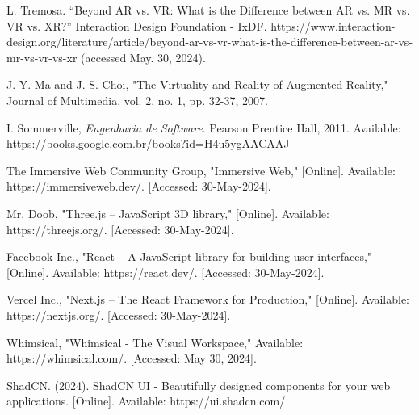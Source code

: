 \documentclass[conference]{IEEEtran}
\begin{document}
\begin{thebibliography}{00}
  L. Tremosa. “Beyond AR vs. VR: What is the Difference between AR vs. MR vs. VR vs. XR?” Interaction Design Foundation - IxDF. https://www.interaction-design.org/literature/article/beyond-ar-vs-vr-what-is-the-difference-between-ar-vs-mr-vs-vr-vs-xr (accessed May. 30, 2024).

  J. Y. Ma and J. S. Choi, "The Virtuality and Reality of Augmented Reality," Journal of Multimedia, vol. 2, no. 1, pp. 32-37, 2007.

  I. Sommerville, \emph{Engenharia de Software}. Pearson Prentice Hall, 2011. Available: https://books.google.com.br/books?id=H4u5ygAACAAJ

  The Immersive Web Community Group, "Immersive Web," [Online]. Available: https://immersiveweb.dev/. [Accessed: 30-May-2024].

  Mr. Doob, "Three.js – JavaScript 3D library," [Online]. Available: https://threejs.org/. [Accessed: 30-May-2024].

  Facebook Inc., "React – A JavaScript library for building user interfaces," [Online]. Available: https://react.dev/. [Accessed: 30-May-2024].

  Vercel Inc., "Next.js – The React Framework for Production," [Online]. Available: https://nextjs.org/. [Accessed: 30-May-2024].

  Whimsical, "Whimsical - The Visual Workspace," Available: https://whimsical.com/. [Accessed: May 30, 2024].

  ShadCN. (2024). ShadCN UI - Beautifully designed components for your web applications. [Online]. Available: https://ui.shadcn.com/

\end{thebibliography}
\end{document}
